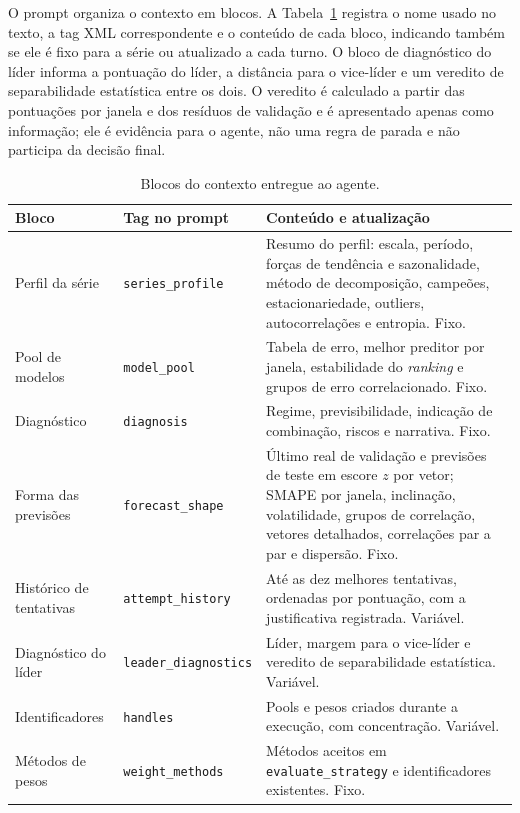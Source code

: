O prompt organiza o contexto em blocos. A Tabela~\ref{tab:blocos_contexto} registra o nome usado no texto, a tag XML correspondente e o conteúdo de cada bloco, indicando também se ele é fixo para a série ou atualizado a cada turno. O bloco de diagnóstico do líder informa a pontuação do líder, a distância para o vice-líder e um veredito de separabilidade estatística entre os dois. O veredito é calculado a partir das pontuações por janela e dos resíduos de validação e é apresentado apenas como informação; ele é evidência para o agente, não uma regra de parada e não participa da decisão final.

\begin{table}[H]
\small
\centering
\caption{Blocos do contexto entregue ao agente.}
\label{tab:blocos_contexto}
\begin{tabular}{@{}p{3.4cm}p{3.8cm}p{6.8cm}@{}}
\toprule
\textbf{Bloco} & \textbf{Tag no prompt} & \textbf{Conteúdo e atualização} \\
\midrule
Perfil da série & \texttt{series\_profile} & Resumo do perfil: escala, período, forças de tendência e sazonalidade, método de decomposição, campeões, estacionariedade, outliers, autocorrelações e entropia. Fixo. \\
Pool de modelos & \texttt{model\_pool} & Tabela de erro, melhor preditor por janela, estabilidade do \textit{ranking} e grupos de erro correlacionado. Fixo. \\
Diagnóstico & \texttt{diagnosis} & Regime, previsibilidade, indicação de combinação, riscos e narrativa. Fixo. \\
Forma das previsões & \texttt{forecast\_shape} & Último real de validação e previsões de teste em escore $z$ por vetor; SMAPE por janela, inclinação, volatilidade, grupos de correlação, vetores detalhados, correlações par a par e dispersão. Fixo. \\
Histórico de tentativas & \texttt{attempt\_history} & Até as dez melhores tentativas, ordenadas por pontuação, com a justificativa registrada. Variável. \\
Diagnóstico do líder & \texttt{leader\_diagnostics} & Líder, margem para o vice-líder e veredito de separabilidade estatística. Variável. \\
Identificadores & \texttt{handles} & Pools e pesos criados durante a execução, com concentração. Variável. \\
Métodos de pesos & \texttt{weight\_methods} & Métodos aceitos em \texttt{evaluate\_strategy} e identificadores existentes. Fixo. \\

\end{tabular}
\end{table}
